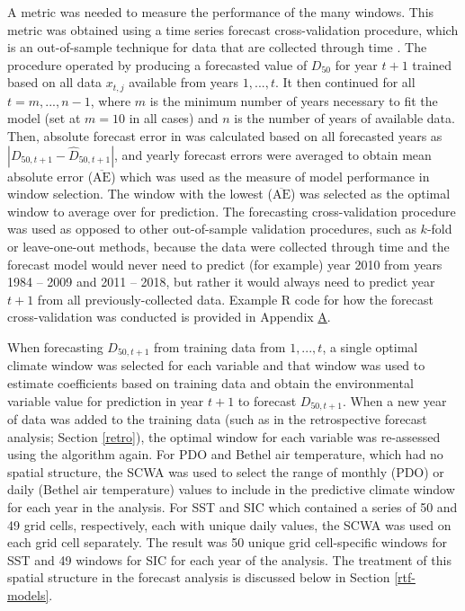 \documentclass[12pt,]{book}
\theoremstyle{definition}
\theoremstyle{definition}
\theoremstyle{definition}
\theoremstyle{remark}
\begin{document}
A metric was needed to measure the performance of the many windows. This
metric was obtained using a time series forecast cross-validation
procedure, which is an out-of-sample technique for data that are
collected through time \citep{arlot-celisse-2010}. The procedure
operated by producing a forecasted value of \(D_{50}\) for year \(t+1\)
trained based on all data \(x_{t,j}\) available from years
\(1, ..., t\). It then continued for all \(t = m, ..., n-1\), where
\(m\) is the minimum number of years necessary to fit the model (set at
\(m = 10\) in all cases) and \(n\) is the number of years of available
data. Then, absolute forecast error in was calculated based on all
forecasted years as \(|D_{50,t+1} - \hat{D}_{50,t+1}|\), and yearly
forecast errors were averaged to obtain mean absolute error
(\(\overline{\text{AE}}\)) which was used as the measure of model
performance in window selection. The window with the lowest
(\(\overline{\text{AE}}\)) was selected as the optimal window to average
over for prediction. The forecasting cross-validation procedure was used
as opposed to other out-of-sample validation procedures, such as
\(k\)-fold or leave-one-out methods, because the data were collected
through time and the forecast model would never need to predict (for
example) year 2010 from years 1984 -- 2009 and 2011 -- 2018, but rather
it would always need to predict year \(t+1\) from all
previously-collected data. Example R code for how the forecast
cross-validation was conducted is provided in Appendix
\protect\hyperlink{appendix-a}{A}.

When forecasting \(D_{50,t+1}\) from training data from \(1,...,t\), a
single optimal climate window was selected for each variable and that
window was used to estimate coefficients based on training data and
obtain the environmental variable value for prediction in year \(t+1\)
to forecast \(D_{50,t+1}\). When a new year of data was added to the
training data (such as in the retrospective forecast analysis; Section
\ref{retro}), the optimal window for each variable was re-assessed using
the algorithm again. For PDO and Bethel air temperature, which had no
spatial structure, the SCWA was used to select the range of monthly
(PDO) or daily (Bethel air temperature) values to include in the
predictive climate window for each year in the analysis. For SST and SIC
which contained a series of 50 and 49 grid cells, respectively, each
with unique daily values, the SCWA was used on each grid cell
separately. The result was 50 unique grid cell-specific windows for SST
and 49 windows for SIC for each year of the analysis. The treatment of
this spatial structure in the forecast analysis is discussed below in
Section \ref{rtf-models}.
\end{document}
